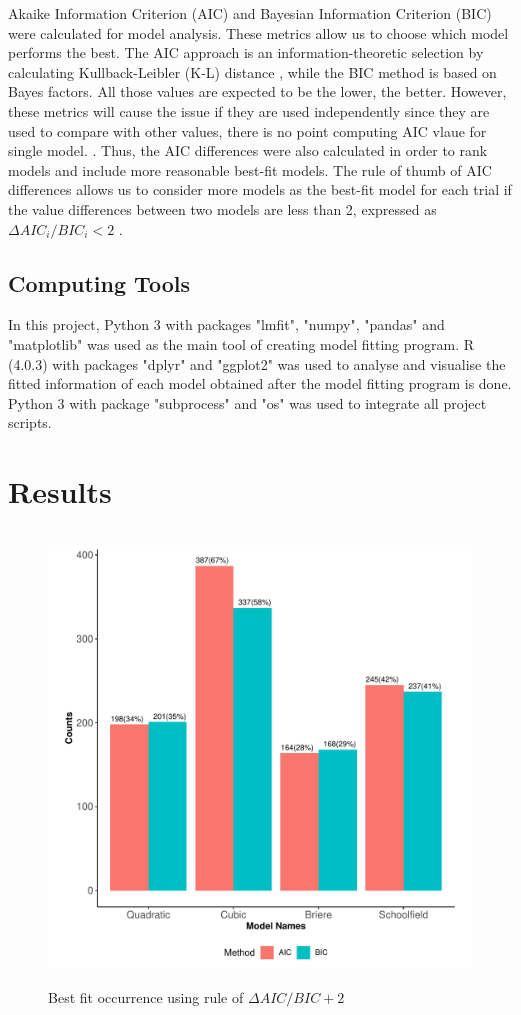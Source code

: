 \documentclass[11pt]{article}
\begin{document}
Akaike Information Criterion (AIC) and Bayesian Information Criterion (BIC) were calculated for model analysis. These metrics allow us to choose which model performs the best. The AIC approach is an information-theoretic selection by calculating Kullback-Leibler (K-L) distance \cite{burnham_anderson_2004} \cite{burnham_anderson2010}, while the BIC method is based on Bayes factors. All those values are expected to be the lower, the better. However, these metrics will cause the issue if they are used independently since they are used to compare with other values, there is no point computing AIC vlaue for single model. \cite{guthery_2003}. Thus, the AIC differences were also calculated in order to rank models and include more reasonable best-fit models. The rule of thumb of AIC differences allows us to consider more models as the best-fit model for each trial if the value differences between two models are less than 2, expressed as $ \Delta AIC_i/BIC_i < 2$ \cite{burnham_anderson2010}.


\subsection{Computing Tools}

In this project, Python 3 with packages "lmfit", "numpy", "pandas" and "matplotlib" was used as the main tool of creating model fitting program. R (4.0.3) with packages "dplyr" and "ggplot2" was used to analyse and visualise the fitted information of each model obtained after the model fitting program is done. Python 3 with package "subprocess" and "os" was used to integrate all project scripts.

\section{Results}
\begin{figure}[H]
    \centering
    \includegraphics[width = 15cm, height = 12cm]{images/bestfit_total_rule2.pdf}
    \caption{Best fit occurrence using rule of $\Delta AIC/BIC + 2$}
\end{figure}
\end{document}
